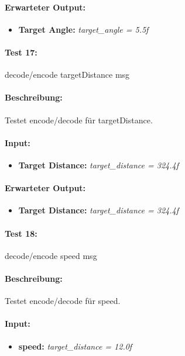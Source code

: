 \documentclass[a4paper, 12pt, titlepage]{scrartcl}
\begin{document}
{			\paragraph{Erwarteter Output:}
			\begin{itemize} \itemsep-0.5em
				\item \textbf{Target Angle:} \emph{target\_angle = 5.5f}
			\end{itemize}
			
			\paragraph{Test 17:}{decode/encode targetDistance msg}
			\paragraph{Beschreibung:} Testet encode/decode für targetDistance.
			\paragraph{Input:}
			\begin{itemize} \itemsep-0.5em
				\item \textbf{Target Distance:} \emph{target\_distance = 324.4f}
			\end{itemize}
			\paragraph{Erwarteter Output:}
			\begin{itemize} \itemsep-0.5em
				\item \textbf{Target Distance:} \emph{target\_distance = 324.4f}
			\end{itemize}
			
			\paragraph{Test 18:}{decode/encode speed msg}
			\paragraph{Beschreibung:} Testet encode/decode für speed.
			\paragraph{Input:}
			\begin{itemize} \itemsep-0.5em
				\item \textbf{speed:} \emph{target\_distance = 12.0f}
			\end{itemize}
}
\end{document}
